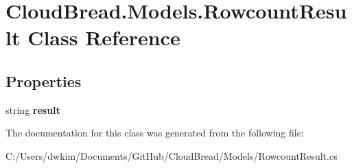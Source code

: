 \hypertarget{a00085}{}\section{Cloud\+Bread.\+Models.\+Rowcount\+Result Class Reference}
\label{a00085}
\subsection*{Properties}
\begin{DoxyCompactItemize}
\item 
string {\bfseries result}\hypertarget{a00085_a2ad88aaf9911458fc271e865fdef62f2}{}\label{a00085_a2ad88aaf9911458fc271e865fdef62f2}

\end{DoxyCompactItemize}


The documentation for this class was generated from the following file\+:\begin{DoxyCompactItemize}
\item 
C\+:/\+Users/dwkim/\+Documents/\+Git\+Hub/\+Cloud\+Bread/\+Models/Rowcount\+Result.\+cs\end{DoxyCompactItemize}
